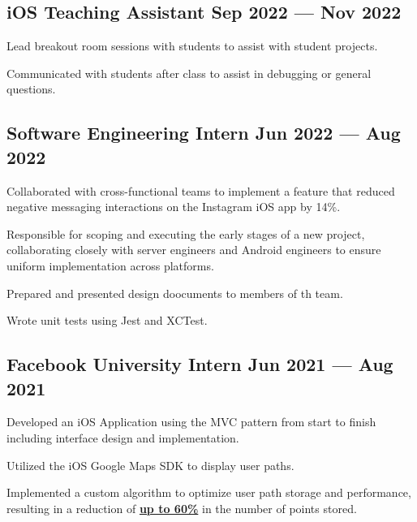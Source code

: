 
\subsection{{iOS Teaching Assistant \hfill Sep 2022 --- Nov 2022}}
\begin{zitemize}
\item Lead breakout room sessions with students to assist with student projects.
\item Communicated with students after class to assist in debugging or general questions.

\end{zitemize}


\subsection{{Software Engineering Intern \hfill Jun 2022 --- Aug 2022}}
\begin{zitemize}
\item Collaborated with cross-functional teams to implement a feature that reduced negative messaging interactions on the Instagram iOS app by 14\%.
\item Responsible for scoping and executing the early stages of a new project, collaborating closely with server engineers and Android engineers to ensure uniform implementation across platforms.
\item Prepared and presented design doocuments to members of th team.
\item Wrote unit tests using Jest and XCTest.
\end{zitemize}

\subsection{{Facebook University Intern \hfill Jun 2021 --- Aug 2021}}
\begin{zitemize}
\item Developed an iOS Application using the MVC pattern from start to finish including interface design and implementation.
\item Utilized the iOS Google Maps SDK to display user paths.
\item Implemented a custom algorithm to optimize user path storage and performance, resulting in a reduction of \href{https://docs.google.com/document/d/1MRAG9OrrXqONw2qEdH7BeSrUC1HFEtD6CoXgO1jC910/edit?usp=sharing}{\bf up to 60\%} in the number of points stored.
\end{zitemize}

